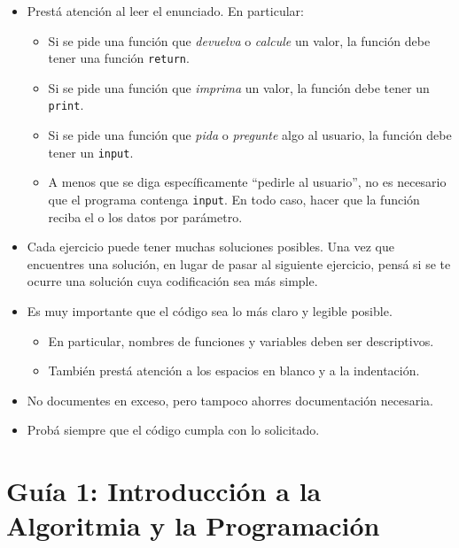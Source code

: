 \documentclass[
  letterpaper,
  DIV=11,
  numbers=noendperiod]{scrreprt}
\providecommand{\tightlist}{%
  \setlength{\itemsep}{0pt}\setlength{\parskip}{0pt}}\usepackage{longtable,booktabs,array}
\begin{document}
\begin{itemize}
\tightlist
\item
  Prestá atención al leer el enunciado. En particular:

  \begin{itemize}
  \tightlist
  \item
    Si se pide una función que \emph{devuelva} o \emph{calcule} un
    valor, la función debe tener una función \texttt{return}.
  \item
    Si se pide una función que \emph{imprima} un valor, la función debe
    tener un \texttt{print}.
  \item
    Si se pide una función que \emph{pida} o \emph{pregunte} algo al
    usuario, la función debe tener un \texttt{input}.
  \item
    A menos que se diga específicamente ``pedirle al usuario'', no es
    necesario que el programa contenga \texttt{input}. En todo caso,
    hacer que la función reciba el o los datos por parámetro.
  \end{itemize}
\item
  Cada ejercicio puede tener muchas soluciones posibles. Una vez que
  encuentres una solución, en lugar de pasar al siguiente ejercicio,
  pensá si se te ocurre una solución cuya codificación sea más simple.
\item
  Es muy importante que el código sea lo más claro y legible posible.

  \begin{itemize}
  \tightlist
  \item
    En particular, nombres de funciones y variables deben ser
    descriptivos.
  \item
    También prestá atención a los espacios en blanco y a la indentación.
  \end{itemize}
\item
  No documentes en exceso, pero tampoco ahorres documentación necesaria.
\item
  Probá siempre que el código cumpla con lo solicitado.
\end{itemize}

\hypertarget{guuxeda-1-introducciuxf3n-a-la-algoritmia-y-la-programaciuxf3n}{%
\section*{Guía 1: Introducción a la Algoritmia y la
Programación}\label{guuxeda-1-introducciuxf3n-a-la-algoritmia-y-la-programaciuxf3n}}
\end{document}
